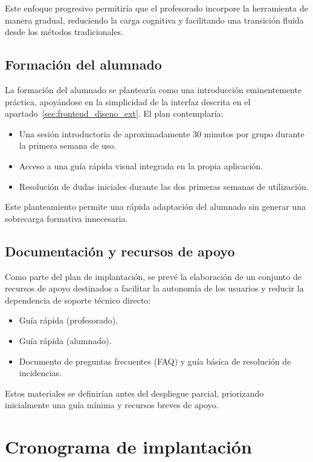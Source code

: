 Este enfoque progresivo permitiría que el profesorado incorpore la herramienta de manera gradual, reduciendo la carga cognitiva y facilitando una transición fluida desde los métodos tradicionales.

\subsection{Formación del alumnado}

La formación del alumnado se plantearía como una introducción eminentemente práctica, apoyándose en la simplicidad de la interfaz descrita en el apartado~\ref{sec:frontend_diseno_ext}. El plan contemplaría:

\begin{itemize}
    \item Una sesión introductoria de aproximadamente 30 minutos por grupo durante la primera semana de uso.
    \item Acceso a una guía rápida visual integrada en la propia aplicación.
    \item Resolución de dudas iniciales durante las dos primeras semanas de utilización.
\end{itemize}

Este planteamiento permite una rápida adaptación del alumnado sin generar una sobrecarga formativa innecesaria.

\subsection{Documentación y recursos de apoyo}

Como parte del plan de implantación, se prevé la elaboración de un conjunto de recursos de apoyo destinados a facilitar la autonomía de los usuarios y reducir la dependencia de soporte técnico directo:

\begin{itemize}
    \item Guía rápida (profesorado).
    \item Guía rápida (alumnado).
    \item Documento de preguntas frecuentes (FAQ) y guía básica de resolución de incidencias.
\end{itemize}

Estos materiales se definirían antes del despliegue parcial, priorizando inicialmente una guía mínima y recursos breves de apoyo.
\section{Cronograma de implantación}
\label{sec:cronograma_implantacion}


